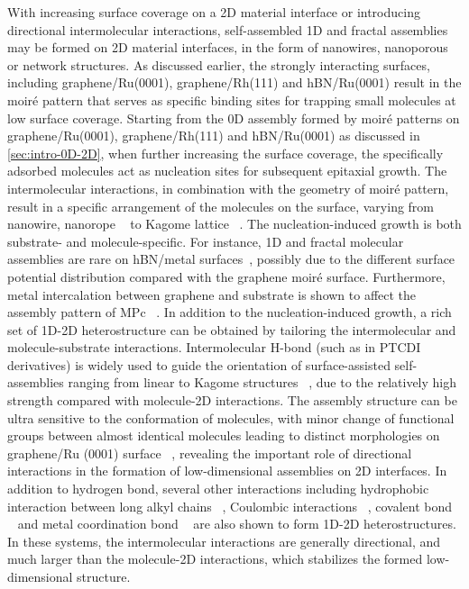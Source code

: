With increasing surface coverage on a 2D material interface or
introducing directional intermolecular interactions, self-assembled 1D
and fractal assemblies may be formed on 2D material interfaces, in the
form of nanowires, nanoporous or network structures.
%
As discussed earlier, the strongly interacting surfaces, including
graphene/\allowbreak{}Ru(0001), graphene/Rh(111) and hBN/Ru(0001) result in the
moiré pattern that serves as specific binding sites for trapping small
molecules at low surface coverage.  Starting from the 0D assembly
formed by moiré patterns on graphene/\allowbreak{}Ru(0001), graphene/Rh(111) and
hBN/Ru(0001) as discussed in \autoref{sec:intro-0D-2D}, when further
increasing the surface coverage, the specifically adsorbed molecules
act as nucleation sites for subsequent epitaxial growth.  The intermolecular interactions, in combination with
the geometry of moiré pattern, result in a specific arrangement of the
molecules on the surface, varying from nanowire, nanorope ~\cite{Maccariello_2014_TCNQ_gr_Ru} to Kagome
lattice ~\cite{Atwood_2002_kagome,Mao_2009_Pc_gr_kagome}.
%
The nucleation-induced growth is both substrate- and
molecule-specific. For instance, 1D and fractal molecular assemblies
are rare on hBN/metal
surfaces~\cite{Schulz_2013_copc_hbn_moire,Schulz_2014_hBN_moire,Iannuzzi_2014_MPc_hBN_Rh,Joshi_2014_TCNQ_hBN},
possibly due to the different surface potential distribution compared
with the graphene moiré surface. Furthermore, metal intercalation
between graphene and substrate is shown to affect the assembly pattern
of MPc
~\cite{Bazarnik_2013_tailor_Fe_Co_gr_Ir,Avvisati_2017_FePc_intercal}.
%
In addition to the nucleation-induced growth, a rich set of 1D-2D
heterostructure can be obtained by tailoring the intermolecular and
molecule-substrate interactions.
%
Intermolecular H-bond (such as in PTCDI derivatives) is widely used to
guide the orientation of surface-assisted self-assemblies ranging from
linear to Kagome structures ~\cite{Slater_2014_HBond_assembl_rev,
  Pollard_2010_hbond_assembly_gr, }, due to the relatively high
strength compared with molecule-2D interactions.
%
The assembly structure can be ultra sensitive to the conformation of
molecules, with minor change of functional groups between almost
identical molecules leading to distinct morphologies on graphene/\allowbreak{}Ru
(0001) surface
~\cite{Meier_2010_polycyclic_gr,Roos_2011_BTP_gr,Roos_2011_hiera_org_gr},
revealing the important role of directional interactions in the
formation of low-dimensional assemblies on 2D
interfaces. 
%
In addition to hydrogen bond, several other interactions including
hydrophobic interaction between long alkyl chains
~\cite{De_Feyter_2003_2D_assem_rev, Deshpande_2012_1D_assemb_gr},
Coulombic interactions ~\cite{Prado_2011_2D_acid_gr}, covalent bond
~\cite{Colson_2011_2DMOF_gr,Colson_2014_2D_COF_gr} and metal
coordination bond ~\cite{Urgel_2015_MOF_BN} are also shown to form
1D-2D heterostructures. In these systems, the intermolecular
interactions are generally directional, and much larger than the molecule-2D
interactions, which stabilizes the formed low-dimensional structure.

